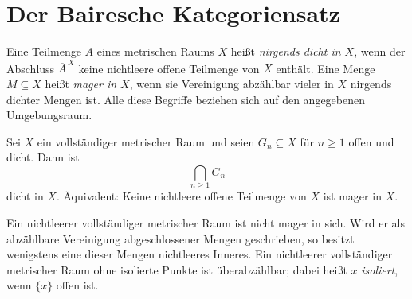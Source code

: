 \section{Der Bairesche Kategoriensatz}

\begin{definition}
\label{b47guide:def:category}
Eine Teilmenge $A$ eines metrischen Raums $X$ heißt
\emph{nirgends dicht in $X$}, wenn der Abschluss $\overline A^{\,X}$
keine nichtleere offene Teilmenge von $X$ enthält.
Eine Menge $M\subseteq X$ heißt \emph{mager in $X$}, wenn sie
Vereinigung abzählbar vieler in $X$ nirgends dichter Mengen ist.
Alle diese Begriffe beziehen sich auf den angegebenen Umgebungsraum.
\end{definition}

\begin{theorem}
\label{b47guide:thm:baire}
Sei $X$ ein vollständiger metrischer Raum und seien $G_n\subseteq X$
für $n\geq1$ offen und dicht. Dann ist
\[
 \bigcap_{n\geq1}G_n
\]
dicht in $X$. Äquivalent: Keine nichtleere offene Teilmenge von $X$
ist mager in $X$.
\cite{baire-notes}
\end{theorem}

\begin{theorem}
\label{b47guide:thm:baire-consequences}
Ein nichtleerer vollständiger metrischer Raum ist nicht mager in sich.
Wird er als abzählbare Vereinigung abgeschlossener Mengen geschrieben,
so besitzt wenigstens eine dieser Mengen nichtleeres Inneres.
Ein nichtleerer vollständiger metrischer Raum ohne isolierte Punkte
ist überabzählbar; dabei heißt $x$ \emph{isoliert}, wenn $\{x\}$ offen ist.
\end{theorem}